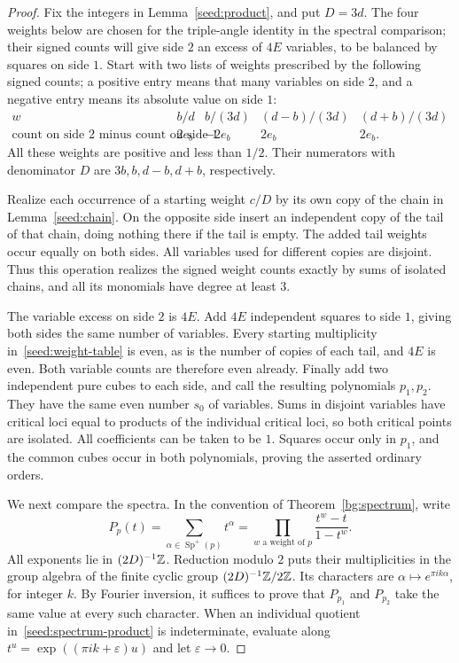 \begin{proof}
Fix the integers in Lemma~\ref{seed:product}, and put $D=3d$.
The four weights below are chosen for the triple-angle identity in the
spectral comparison; their signed counts will give side $2$ an excess
of $4E$ variables, to be balanced by squares on side $1$.
Start with two lists of weights prescribed by the following signed
counts; a positive entry means that many variables on side $2$, and a
negative entry means its absolute value on side $1$:
\begin{equation}\label{seed:weight-table}
\begin{array}{c|rrrr}
 w& b/d&b/(3d)&(d-b)/(3d)&(d+b)/(3d)\\\hline
 \text{count on side $2$ minus count on side $1$}
   &2e_b&-2e_b&2e_b&2e_b.
\end{array}
\end{equation}
All these weights are positive and less than $1/2$.  Their numerators
with denominator $D$ are $3b,b,d-b,d+b$, respectively.

Realize each occurrence of a starting weight $c/D$ by its own copy of
the chain in Lemma~\ref{seed:chain}.  On the opposite side insert an
independent copy of the tail of that chain, doing nothing there if the
tail is empty.  The added tail weights occur equally on both sides.
All variables used for different copies are disjoint.  Thus this
operation realizes the signed weight counts exactly by sums of
isolated chains, and all its monomials have degree at least $3$.

The variable excess on side $2$ is $4E$.  Add $4E$ independent squares
to side $1$, giving both sides the same number of variables.  Every
starting multiplicity in~\eqref{seed:weight-table} is even, as is the
number of copies of each tail, and $4E$ is even.  Both variable counts
are therefore even already.  Finally add two independent pure cubes
to each side, and call the resulting polynomials $p_1,p_2$.  They have
the same even number $s_0$ of variables.  Sums in disjoint variables
have critical loci equal to products of the individual critical loci,
so both critical points are isolated.  All coefficients can be taken
to be $1$.  Squares occur only in $p_1$, and the common cubes occur in
both polynomials, proving the asserted ordinary orders.

We next compare the spectra.  In the convention of
Theorem~\ref{bg:spectrum}, write
\begin{equation}\label{seed:spectrum-product}
 P_p(t)=\sum_{\alpha\in\operatorname{Sp}^{+}(p)}t^\alpha
        =\prod_{w\text{ a weight of }p}\frac{t^w-t}{1-t^w}.
\end{equation}
All exponents lie in $(2D)^{-1}\mathbb Z$.  Reduction modulo $2$ puts their
multiplicities in the group algebra of the finite cyclic group
$(2D)^{-1}\mathbb Z/2\mathbb Z$.  Its characters are
$\alpha\mapsto e^{\pi i k\alpha}$, for integer $k$.  By Fourier
inversion, it suffices to prove that $P_{p_1}$ and $P_{p_2}$ take the
same value at every such character.  When an individual quotient
in~\eqref{seed:spectrum-product} is indeterminate, evaluate along
$t^u=\exp((\pi i k+\varepsilon)u)$ and let $\varepsilon\to0$.


\end{proof}
